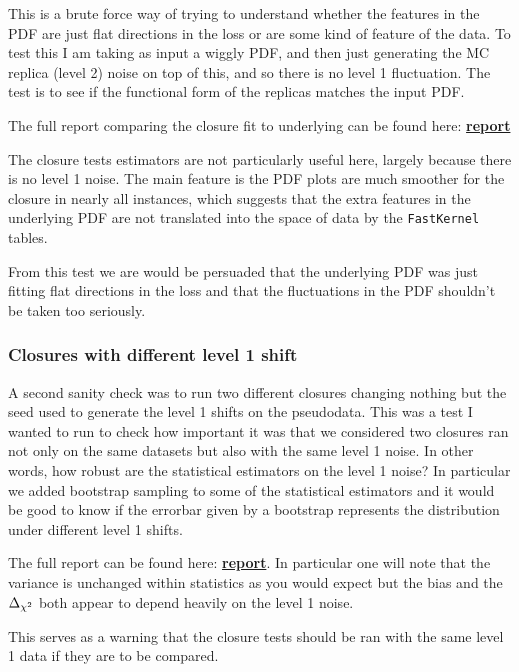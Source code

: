 This is a brute force way of trying to understand whether the features in the PDF
are just flat directions in the loss or are some kind of feature of the data. To
test this I am taking as input a wiggly PDF, and then just generating the MC
replica (level 2) noise on top of this, and so there is no level 1 fluctuation.
The test is to see if the functional form of the replicas matches the input PDF.

The full report comparing the closure fit to underlying can be found here:
\href{https://vp.nnpdf.science/tHdjyBVTQEOlfkNjUXPMFQ==}{\bf{report}}

The closure tests estimators are not particularly useful here, largely because
there is no level 1 noise. The main feature is the PDF plots are much smoother
for the closure in nearly all instances, which suggests that the extra features
in the underlying PDF are not translated into the space of data by the
\texttt{FastKernel} tables.

From this test we are would be persuaded that the underlying PDF was just fitting
flat directions in the loss and that the fluctuations in the PDF shouldn't be
taken too seriously.

\subsubsection*{Closures with different level 1 shift}

A second sanity check was to run two different closures changing nothing but the
seed used to generate the level 1 shifts on the pseudodata. This was a test I
wanted to run to check how important it was that we considered two closures ran
not only on the same datasets but also with the same level 1 noise. In other
words, how robust are the statistical estimators on the level 1 noise? In particular
we added bootstrap sampling to some of the statistical estimators and it would
be good to know if the errorbar given by a bootstrap represents the distribution
under different level 1 shifts.

The full report can be found here:
\href{https://vp.nnpdf.science/mbcTUd6-TQmQFvaGd37bkg==}{\bf{report}}. In particular
one will note that the variance is unchanged within statistics as you would expect
but the bias and the $\Delta_{\chi^{2}}$ both appear to depend heavily on the level 1 noise.

This serves as a warning that the closure tests should be ran with the same level
1 data if they are to be compared.


